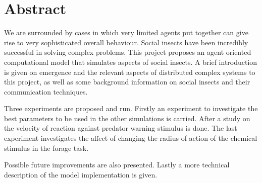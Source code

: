 

\begingroup
\let\clearpage\relax
\let\cleardoublepage\relax
\let\cleardoublepage\relax

\chapter*{Abstract} %

We are surrounded by cases in which very limited agents put together can give rise to very sophisticated overall behaviour. Social insects have been incredibly successful in solving complex problems. This project proposes an agent oriented computational model that simulates aspects of social insects.
A brief introduction is given on emergence and the relevant aspects of distributed complex systems to this project, as well as some background information on social insects and their communication techniques.

Three experiments are proposed and run. Firstly an experiment to investigate the best parameters to be used in the other simulations is carried. After a study on the velocity of reaction against predator warning stimulus is done. The last experiment investigates the affect of changing the radius of action of the chemical stimulus in the forage task.

Possible future improvements are also presented. Lastly a more technical description of the model implementation is given. 

\endgroup

\vfill